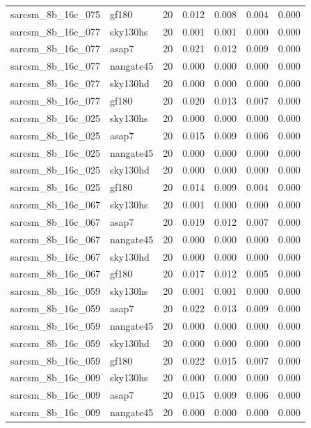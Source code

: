 \begin{tabular}{llrrrrr}
sarcsm\_8b\_16c\_075 & gf180 & 20 & 0.012 & 0.008 & 0.004 & 0.000 \\
sarcsm\_8b\_16c\_077 & sky130hs & 20 & 0.001 & 0.001 & 0.000 & 0.000 \\
sarcsm\_8b\_16c\_077 & asap7 & 20 & 0.021 & 0.012 & 0.009 & 0.000 \\
sarcsm\_8b\_16c\_077 & nangate45 & 20 & 0.000 & 0.000 & 0.000 & 0.000 \\
sarcsm\_8b\_16c\_077 & sky130hd & 20 & 0.000 & 0.000 & 0.000 & 0.000 \\
sarcsm\_8b\_16c\_077 & gf180 & 20 & 0.020 & 0.013 & 0.007 & 0.000 \\
sarcsm\_8b\_16c\_025 & sky130hs & 20 & 0.000 & 0.000 & 0.000 & 0.000 \\
sarcsm\_8b\_16c\_025 & asap7 & 20 & 0.015 & 0.009 & 0.006 & 0.000 \\
sarcsm\_8b\_16c\_025 & nangate45 & 20 & 0.000 & 0.000 & 0.000 & 0.000 \\
sarcsm\_8b\_16c\_025 & sky130hd & 20 & 0.000 & 0.000 & 0.000 & 0.000 \\
sarcsm\_8b\_16c\_025 & gf180 & 20 & 0.014 & 0.009 & 0.004 & 0.000 \\
sarcsm\_8b\_16c\_067 & sky130hs & 20 & 0.001 & 0.000 & 0.000 & 0.000 \\
sarcsm\_8b\_16c\_067 & asap7 & 20 & 0.019 & 0.012 & 0.007 & 0.000 \\
sarcsm\_8b\_16c\_067 & nangate45 & 20 & 0.000 & 0.000 & 0.000 & 0.000 \\
sarcsm\_8b\_16c\_067 & sky130hd & 20 & 0.000 & 0.000 & 0.000 & 0.000 \\
sarcsm\_8b\_16c\_067 & gf180 & 20 & 0.017 & 0.012 & 0.005 & 0.000 \\
sarcsm\_8b\_16c\_059 & sky130hs & 20 & 0.001 & 0.001 & 0.000 & 0.000 \\
sarcsm\_8b\_16c\_059 & asap7 & 20 & 0.022 & 0.013 & 0.009 & 0.000 \\
sarcsm\_8b\_16c\_059 & nangate45 & 20 & 0.000 & 0.000 & 0.000 & 0.000 \\
sarcsm\_8b\_16c\_059 & sky130hd & 20 & 0.000 & 0.000 & 0.000 & 0.000 \\
sarcsm\_8b\_16c\_059 & gf180 & 20 & 0.022 & 0.015 & 0.007 & 0.000 \\
sarcsm\_8b\_16c\_009 & sky130hs & 20 & 0.000 & 0.000 & 0.000 & 0.000 \\
sarcsm\_8b\_16c\_009 & asap7 & 20 & 0.015 & 0.009 & 0.006 & 0.000 \\
sarcsm\_8b\_16c\_009 & nangate45 & 20 & 0.000 & 0.000 & 0.000 & 0.000 \\

\end{tabular}
